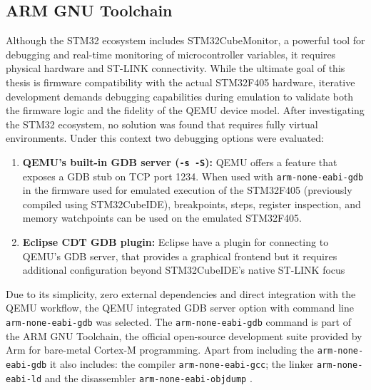 \subsection{ARM GNU Toolchain}
\label{chap:back_arm_toolchain}

Although the STM32 ecosystem includes STM32CubeMonitor\cite{STM32CubeMonitor2026}, a powerful tool 
for debugging and real-time monitoring of microcontroller variables, it requires 
physical hardware and ST-LINK connectivity. While the ultimate goal of this thesis is 
firmware compatibility with the actual STM32F405 hardware, iterative development 
demands debugging capabilities during emulation to validate both the firmware logic 
and the fidelity of the QEMU device model. After investigating the STM32 ecosystem, 
no solution was found that requires fully virtual environments. Under this 
context two debugging options were evaluated:

\begin{enumerate}
    \item \textbf{QEMU's built-in GDB server (\texttt{-s -S}):} 
        QEMU offers a feature that exposes a GDB stub on TCP port 1234. When used with \texttt{arm-none-eabi-gdb} in the firmware used for emulated execution of the STM32F405 (previously compiled using STM32CubeIDE), breakpoints, steps, register inspection, and memory watchpoints can be used on the emulated STM32F405.
    \item \textbf{Eclipse CDT GDB plugin:} 
        Eclipse have a plugin for connecting to QEMU's GDB server, that provides a graphical frontend but it requires additional configuration beyond STM32CubeIDE's native ST-LINK focus
\end{enumerate}

    
Due to its simplicity, zero external dependencies and direct integration with 
the QEMU workflow, the QEMU integrated GDB server option with command 
line \texttt{arm-none-eabi-gdb} was selected. The \texttt{arm-none-eabi-gdb} command is part 
of the ARM GNU Toolchain, the official open-source development suite provided 
by Arm for bare-metal Cortex-M programming. Apart from including the \texttt{arm-none-eabi-gdb} 
it also includes: the compiler \texttt{arm-none-eabi-gcc}; the linker \texttt{arm-none-eabi-ld} 
and the disassembler \texttt{arm-none-eabi-objdump} \cite{ArmGNU2026}\cite{ArmDocumentation2026}.